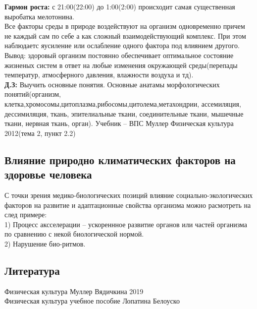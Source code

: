 \documentclass[a4paper, 12pt]{article}
\begin{document}
\textbf{Гармон роста:} с 21:00(22:00) до 1:00(2:00) происходит самая существенная выробатка мелотонина.\\

Все факторы среды в природе воздействуют на организм одновременно причем не каждый сам по себе а как сложный взаимодействующий комплекс. При этом наблюдаетс яусиление или ослабление одного фактора под влиянием другого.\\

Вывод: здоровый организм постоянно обеспечивает оптимальное состояние жизненых систем в ответ на любые изменения окружающей среды(перепады температур, атмосферного давления, влажности воздуха и тд).\\

\textbf{Д.З:}
 Выучить основные понятия. Основные анатамы морфологических понятий(организм, клетка,хромосомы,цитоплазма,рибосомы,цитолема,метахондрии, ассемиляция, дессимиляция, ткань, эпителиальные ткани, соединительные ткани, мышечные ткани, нервная ткань, орган). Учебник -- ВПС Муллер Физическая культура 2012(тема 2, пункт 2.2)\\

\subsection{Влияние природно климатических факторов на здоровье человека}

С точки зрения медико-биологических позиций влияние социально-экологических факторов на развитие и адаптационные свойства организма можно расмотреть на след примере:\\
1) Процесс аксселерации -- ускореннное развитие органов или частей организма по сравнению с некой биологической нормой.\\
2) Нарушение био-ритмов.\\








\newpage
\subsection*{Литература} 
Физическая культура Муллер Вядичкина 2019\\
Физическая культура учебное пособие Лопатина Белоуско \\ 
\end{document}
